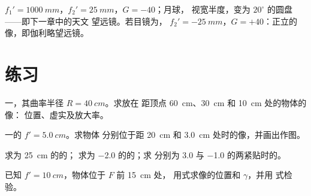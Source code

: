 \begin{example}[一行式望远镜]\label{ex:b1:mirrors-thin-lenses:afocal}
$f_1' = \qty{1000}{mm}$，$f_2' = \qty{25}{mm}$，$G = -40$；月球，
视宽半度，变为 $20^\circ$ 的圆盘——即下一章中的天文
望远镜。若目镜为，
$f_2' = \qty{-25}{mm}$，$G = +40$：正立的像，即伽利略望远镜。
\end{example}

\section{练习}

\begin{exercise}[$\star$]\label{exo:b1:mirrors-thin-lenses:1}
一，其曲率半径 $R = \qty{40}{cm}$。求放在
距顶点 \qty{60}{cm}、\qty{30}{cm} 和 \qty{10}{cm} 处的物体的像：
位置、虚实及放大率。
\end{exercise}

\begin{exercise}[$\star$]\label{exo:b1:mirrors-thin-lenses:2}
一的 $f' = \qty{5.0}{cm}$。求物体
分别位于距 \qty{20}{cm} 和 \qty{3.0}{cm} 处时的像，并画出作图。
\end{exercise}

\begin{exercise}[$\star$]\label{exo:b1:mirrors-thin-lenses:3}
求为 \qty{25}{cm} 的的；
求为 \qty{-2.0}{\delta} 的的；求
分别为 \qty{+3.0}{\delta} 与 \qty{-1.0}{\delta} 的两紧贴时的。
\end{exercise}

\begin{exercise}[$\star$]\label{exo:b1:mirrors-thin-lenses:4}
已知 $f' = \qty{10}{cm}$，物体位于 $F$ 前 \qty{15}{cm} 处，
用式求像的位置和 $\gamma$，并用
式检验。
\end{exercise}


